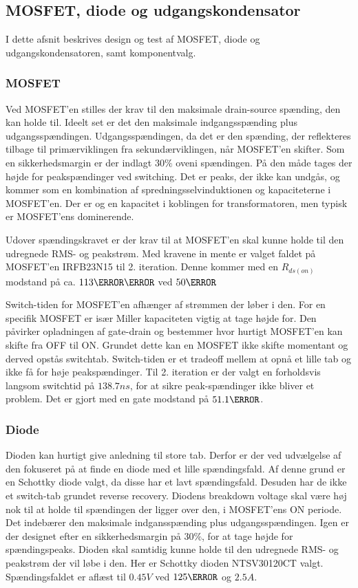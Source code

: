 \subsection{MOSFET, diode og udgangskondensator}
I dette afsnit beskrives design og test af MOSFET, diode og udgangskondensatoren, samt komponentvalg.

\subsubsection{MOSFET}
\noindent Ved MOSFET'en stilles der krav til den maksimale drain-source spænding, den kan holde til. Ideelt set er det den maksimale indgangsspænding plus udgangsspændingen. Udgangsspændingen, da det er den spænding, der reflekteres tilbage til primærviklingen fra sekundærviklingen, når MOSFET'en skifter. Som en sikkerhedsmargin er der indlagt $30\percent$ oveni spændingen. På den måde tages der højde for peakspændinger ved switching. Det er peaks, der ikke kan undgås, og kommer som en kombination af spredningsselvinduktionen og kapaciteterne i MOSFET'en. Der er og en kapacitet i koblingen for transformatoren, men typisk er MOSFET'ens dominerende. 


Udover spændingskravet er der krav til at MOSFET'en skal kunne holde til den udregnede RMS- og peakstrøm. Med kravene in mente er valget faldet på MOSFET'en IRFB23N15\cite{IRFB23N15} til 2. iteration. Denne kommer med en $R_{ds(on)}$ modstand på ca. $113\milli \ohm$ ved $50\degreeCelsius$

Switch-tiden for MOSFET'en afhænger af strømmen der løber i den. For en specifik MOSFET er især Miller kapaciteten vigtig at tage højde for. Den påvirker opladningen af gate-drain og bestemmer hvor hurtigt MOSFET'en kan skifte fra OFF til ON. Grundet dette kan en MOSFET ikke skifte momentant og derved opstås switchtab. Switch-tiden er et tradeoff mellem at opnå et lille tab og ikke få for høje peakspændinger. Til 2. iteration er der valgt en forholdsvis langsom switchtid på $138.7ns$, for at sikre peak-spændinger ikke bliver et problem. Det er gjort med en gate modstand på $51.1\ohm$.

\subsubsection{Diode}
\noindent Dioden kan hurtigt give anledning til store tab. Derfor er der ved udvælgelse af den fokuseret på at finde en diode med et lille spændingsfald. Af denne grund er en Schottky diode valgt, da disse har et lavt spændingsfald. Desuden har de ikke et switch-tab grundet reverse recovery. Diodens breakdown voltage skal være høj nok til at holde til spændingen der ligger over den, i MOSFET'ens ON periode. Det indebærer den maksimale indgansspænding plus udgangsspændingen. Igen er der designet efter en sikkerhedsmargin på $30\percent$, for at tage højde for spændingspeaks. Dioden skal samtidig kunne holde til den udregnede RMS- og peakstrøm der vil løbe i den. Her er Schottky dioden NTSV30120CT\cite{NTSV30120} valgt. Spændingsfaldet er aflæst til $0.45V$ ved $125\degreeCelsius$ og $2.5A$.  

